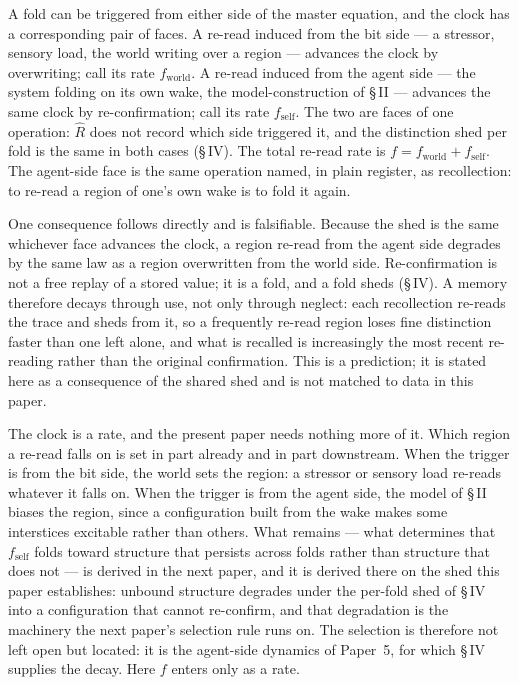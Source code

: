 \documentclass[11pt,oneside]{report}
\theoremstyle{definition}
\theoremstyle{remark}
\begin{document}
A fold can be triggered from either side of the master equation, and the
clock has a corresponding pair of faces. A re-read induced from the bit
side --- a stressor, sensory load, the world writing over a region ---
advances the clock by overwriting; call its rate
\ensuremath{f_{\mathrm{world}}}. A re-read induced from the agent side ---
the system folding on its own wake, the model-construction of \S\,II ---
advances the same clock by re-confirmation; call its rate
\ensuremath{f_{\mathrm{self}}}. The two are faces of one operation:
\ensuremath{\hat{R}} does not record which side triggered it, and the
distinction shed per fold is the same in both cases (\S\,IV). The total
re-read rate is \ensuremath{f = f_{\mathrm{world}} + f_{\mathrm{self}}}.
The agent-side face is the same operation named, in plain register, as
recollection: to re-read a region of one's own wake is to fold it again.

One consequence follows directly and is falsifiable. Because the shed is
the same whichever face advances the clock, a region re-read from the
agent side degrades by the same law as a region overwritten from the
world side. Re-confirmation is not a free replay of a stored value; it is
a fold, and a fold sheds (\S\,IV). A memory therefore decays through use,
not only through neglect: each recollection re-reads the trace and sheds
from it, so a frequently re-read region loses fine distinction faster than
one left alone, and what is recalled is increasingly the most recent
re-reading rather than the original confirmation. This is a prediction; it
is stated here as a consequence of the shared shed and is not matched to
data in this paper.

The clock is a rate, and the present paper needs nothing more of it. Which
region a re-read falls on is set in part already and in part downstream.
When the trigger is from the bit side, the world sets the region: a
stressor or sensory load re-reads whatever it falls on. When the trigger
is from the agent side, the model of \S\,II biases the region, since a
configuration built from the wake makes some interstices excitable rather
than others. What remains --- what determines that
\ensuremath{f_{\mathrm{self}}} folds toward structure that persists across
folds rather than structure that does not --- is derived in the next
paper, and it is derived there on the shed this paper establishes:
unbound structure degrades under the per-fold shed of \S\,IV into a
configuration that cannot re-confirm, and that degradation is the
machinery the next paper's selection rule runs on. The selection is
therefore not left open but located: it is the agent-side dynamics of
Paper~5, for which \S\,IV supplies the decay. Here \ensuremath{f} enters
only as a rate.
\end{document}

